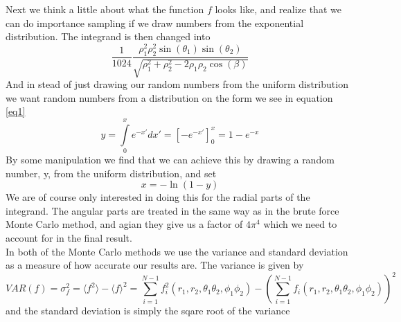 \documentclass[a4paper,english, 10pt, twoside]{article}
\begin{document}
Next we think a little about what the function $f$ looks like, and realize that we can do importance sampling if we draw numbers 
from the exponential distribution. The integrand is then changed into
$$
\frac{1}{1024}\frac{\rho_1^2\rho_2^2\sin(\theta_1)\sin(\theta_2)}{\sqrt{\rho_1^2 + \rho_2^2 -2\rho_1\rho_2\cos(\beta)}}
$$
And in stead of just drawing our random numbers from the uniform distribution we want random numbers from a distribution on the 
form we see in equation \eqref{eq1}
\begin{equation}\label{eq1}
y = \int\limits_0^xe^{-x'}dx' = \left[-e^{-x'}\right]_0^x = 1-e^{-x}
\end{equation}
By some manipulation we find that we can achieve this by drawing a random number, y, from the uniform distribution, and set 
$$
x = -\ln(1-y)
$$
We are of course only interested in doing this for the radial parts of the integrand. The angular parts are treated in the same 
way as in the brute force Monte Carlo method, and agian they give us a factor of $4\pi^4$ which we need to account for in the 
final result.\\

In both of the Monte Carlo methods we use the variance and standard deviation as a measure of how accurate our results are. The 
variance is given by
\begin{equation*}
VAR(f) = \sigma^2_f = \langle f^2\rangle - \langle f \rangle^2 = \sum\limits_{i=1}^{N-1}f^2_i(r_1,r_2,\theta_1\theta_2,\phi_1\phi_2)
- \left(\sum\limits_{i=1}^{N-1}f_i(r_1,r_2,\theta_1\theta_2,\phi_1\phi_2)\right)^2
\end{equation*}
and the standard deviation is simply the sqare root of the variance
\end{document}
